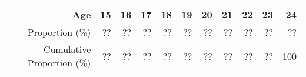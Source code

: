 \begin{tabular}{*{11}r}
  \toprule
  Age                        & 15 & 16 & 17 & 18 & 19 & 20 & 21 & 22 & 23 & 24 \\
  \midrule
  Proportion (\%)            & ?? & ?? & ?? & ?? & ?? & ?? & ?? & ?? & ?? & ?? \\
  Cumulative Proportion (\%) & ?? & ?? & ?? & ?? & ?? & ?? & ?? & ?? & ?? &100 \\
  \bottomrule
\end{tabular}
